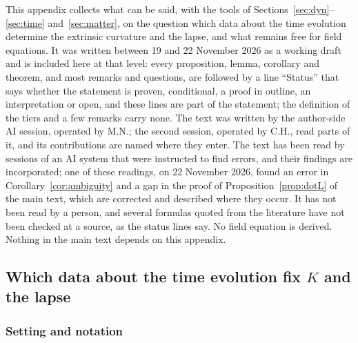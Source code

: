 \documentclass[11pt,a4paper]{article}
\theoremstyle{stmt}
\theoremstyle{defn}
\theoremstyle{rmk}
\numberwithin{equation}{section}
\begin{document}
{This appendix collects what can be said, with the tools of Sections~\ref{sec:dyn}--\ref{sec:time} and~\ref{sec:matter}, on the question which data about the time evolution determine the extrinsic curvature and the lapse, and what remains free for field equations. It was written between 19 and 22 November 2026 as a working draft and is included here at that level: every proposition, lemma, corollary and theorem, and most remarks and questions, are followed by a line ``Status'' that says whether the statement is proven, conditional, a proof in outline, an interpretation or open, and these lines are part of the statement; the definition of the tiers and a few remarks carry none. The text was written by the author-side AI session, operated by M.N.; the second session, operated by C.H., read parts of it, and its contributions are named where they enter. The text has been read by sessions of an AI system that were instructed to find errors, and their findings are incorporated; one of these readings, on 22 November 2026, found an error in Corollary~\ref{cor:ambiguity} and a gap in the proof of Proposition~\ref{prop:dotL} of the main text, which are corrected and described where they occur. It has not been read by a person, and several formulas quoted from the literature have not been checked at a source, as the status lines say. No field equation is derived. Nothing in the main text depends on this appendix.

\subsection{Which data about the time evolution fix $K$ and the lapse}\label{sec:t-data}

\subsubsection{Setting and notation}

}
\end{document}
